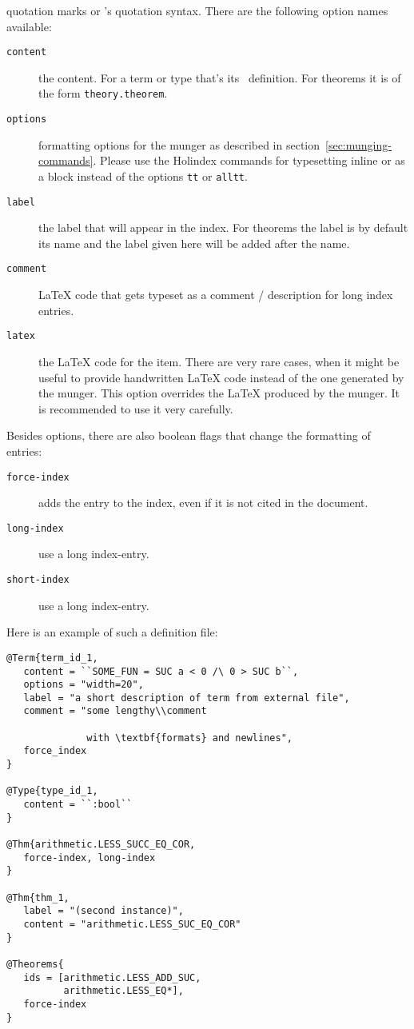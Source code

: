 quotation marks or \HOL{}'s quotation syntax. There are the following
option names available:
\begin{description}
  \item[\texttt{content}]
    the content. For a term or type that's its \HOL{}\ definition.
    For theorems it is of the form \texttt{theory.theorem}.
  \item[\texttt{options}]
    formatting options for the munger as described in section~\ref{sec:munging-commands}.
    Please use the Holindex commands for typesetting inline or as a block instead of the options \texttt{tt} or \texttt{alltt}.
  \item[\texttt{label}] the label that will appear in the index. For
    theorems the label is by default its name and the label given here
    will be added after the name.
  \item[\texttt{comment}] \LaTeX{} code that gets typeset as a comment / description
    for long index entries.
  \item[\texttt{latex}] the \LaTeX{} code for the item. There are very rare cases,
    when it might be useful to provide handwritten \LaTeX{} code instead of the one
    generated by the munger. This option overrides the \LaTeX{} produced by the munger.
    It is recommended to use it very carefully.
\end{description}
Besides options, there are also boolean flags that change the formatting of entries:
\begin{description}
  \item[\texttt{force-index}]
    adds the entry to the index, even if it is not cited in the document.
  \item[\texttt{long-index}]
    use a long index-entry.
  \item[\texttt{short-index}]
    use a long index-entry.
\end{description}
Here is an example of such a \HOL{} definition file:

\begin{verbatim}
@Term{term_id_1,
   content = ``SOME_FUN = SUC a < 0 /\ 0 > SUC b``,
   options = "width=20",
   label = "a short description of term from external file",
   comment = "some lengthy\\comment

              with \textbf{formats} and newlines",
   force_index
}

@Type{type_id_1,
   content = ``:bool``
}

@Thm{arithmetic.LESS_SUCC_EQ_COR,
   force-index, long-index
}

@Thm{thm_1,
   label = "(second instance)",
   content = "arithmetic.LESS_SUC_EQ_COR"
}

@Theorems{
   ids = [arithmetic.LESS_ADD_SUC,
          arithmetic.LESS_EQ*],
   force-index
}
\end{verbatim}


